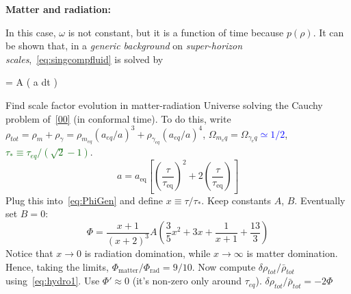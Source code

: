 \begin{mycolorbox}
    \textbf{Matter and radiation:} 
    
    In this case, $\omega$ is not constant, but it is a function of time because $p(\rho)$. It can be shown that, in a \textit{generic background} on \textit{super-horizon scales},~\eqref{eq:singcompfluid} is solved by
    \begin{eqopt}[darkred]\label{eq:PhiGen}
     \Phi = A  \left(  \int a dt \right)
    \end{eqopt}
    Find scale factor evolution in matter-radiation Universe solving the Cauchy problem of~\eqref{00} (in conformal time). To do this, write $\rho_{tot}=\rho_m+\rho_\gamma= \rho_{m_{eq}}(a_{eq}/a)^3+\rho_{\gamma_{eq}}(a_{eq}/a)^4$, $\Omega_{m_eq}=\Omega_{\gamma_eq}$\textcolor{blue}{$\simeq 1/2$}, \textcolor{darkgreen}{$\tau_*\equiv \tau_{eq}/(\sqrt{2}-1)$}.
\begin{equation}
    a = a_{\mathrm{eq}}\!\left[\left(\frac{\tau}{\tau_{\mathrm{eq}}}\right)^{2}
      + 2\left(\frac{\tau}{\tau_{\mathrm{eq}}}\right)\right]
\end{equation}
    Plug this into~\eqref{eq:PhiGen} and define $x\equiv \tau/\tau_*$. Keep constants $A$, $B$. Eventually set $B=0$:
    \begin{equation}
        \Phi = \frac{x + 1}{(x + 2)^{3}}
         A\!\left(\frac{3}{5}x^{2} + 3x + \frac{1}{x + 1} + \frac{13}{3}\right)  
    \end{equation}
    Notice that $x \rightarrow 0$ is radiation domination, while $x\rightarrow \infty$ is matter domination. 
    Hence, taking the limits, $\Phi_{\mathrm{matter}}/\Phi_{\mathrm{rad}} = 9/10$.
    Now compute $\delta \rho_{tot}/ \bar{\rho}_{tot}$ using~\eqref{eq:hydro1}. Use $\Phi'\approx 0$ (it's non-zero only around $\tau_{eq}$). $\delta \rho_{tot}/ \bar{\rho}_{tot}=-2\Phi$
\end{mycolorbox}

    

    